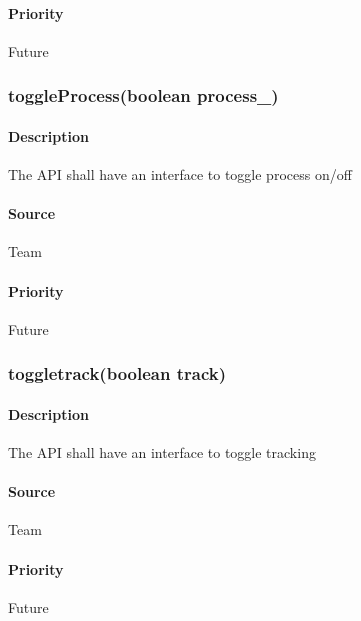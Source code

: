 \paragraph{Priority}
Future
\subsubsection{toggleProcess(boolean process\_)}
\paragraph{Description}
The API shall have an interface to toggle process on/off
\paragraph{Source}
Team
\paragraph{Priority}
Future
\subsubsection{toggletrack(boolean track)}
\paragraph{Description}
The API shall have an interface to toggle tracking
\paragraph{Source}
Team
\paragraph{Priority}
Future









